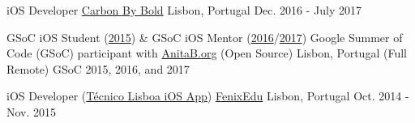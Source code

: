\begin{cventries}

  \cventryShort
    {iOS Developer}
    {\href{https://www.carbonbybold.com/pt-pt/}{Carbon By Bold}}
    {Lisbon, Portugal}
    {Dec. 2016 - July 2017}

  \cventryShort
    {GSoC iOS Student (\href{https://docs.google.com/presentation/d/1yv4XuNNpTgDkyOjL9SSjGe7PSZuwpbah42mQCACxdXQ/}{2015}) \& GSoC iOS Mentor (\href{https://summerofcode.withgoogle.com/archive/2016/projects/5509901874888704/}{2016}/\href{https://summerofcode.withgoogle.com/archive/2017/projects/5508656065937408/}{2017})}
    {Google Summer of Code (GSoC) participant with \href{http://anitaborg.org/}{AnitaB.org} (Open Source)}
    {Lisbon, Portugal (Full Remote)}
    {GSoC 2015, 2016, and 2017}
    
  \cventryShort
    {iOS Developer (\href{https://apps.apple.com/us/app/tecnico-lisboa/id959976468}{Técnico Lisboa iOS App})}
    {\href{http://fenixedu.org/}{FenixEdu}}
    {Lisbon, Portugal}
    {Oct. 2014 - Nov. 2015}

\end{cventries}

